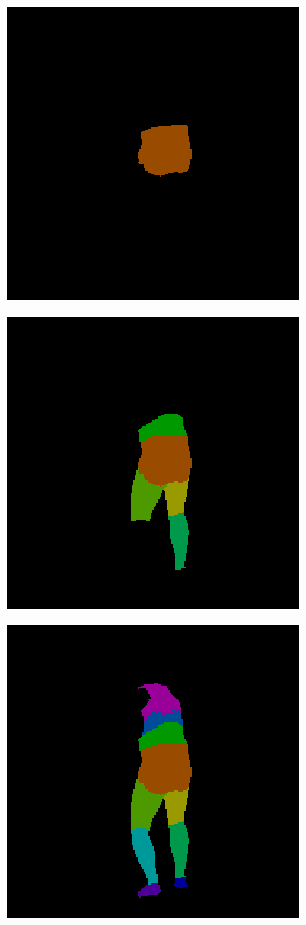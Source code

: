 \documentclass[12pt,a4paper]{article}
\begin{document}
\begin{figure}
\centering
\begin{subfigure}{.19\textwidth}
\centering
  \includegraphics[scale=0.3]{02_05_c0005_segm_80_2c.png}
\end{subfigure}
\begin{subfigure}{.19\textwidth}
  \centering
  \includegraphics[scale=0.3]{02_05_c0005_segm_80_6c.png}
\end{subfigure}
\begin{subfigure}{.19\textwidth}
  \centering
  \includegraphics[scale=0.3]{02_05_c0005_segm_80_12c.png}

\end{subfigure}
\end{figure}
\end{document}
